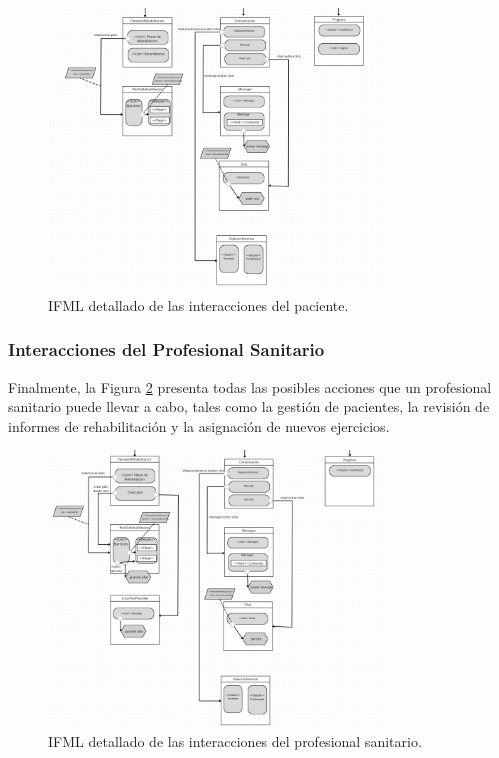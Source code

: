 \documentclass{article}
\begin{document}
\begin{figure}[H]
	\centering
	\includegraphics[width=0.8\textwidth]{images/ifml_paciente.png}
	\caption{IFML detallado de las interacciones del paciente.}
	\label{fig:ifml_paciente}
\end{figure}
\newpage
\subsubsection{Interacciones del Profesional Sanitario}

Finalmente, la Figura \ref{fig:ifml_profesional} presenta todas las posibles acciones que un profesional sanitario puede llevar a cabo, tales como la gestión de pacientes, la revisión de informes de rehabilitación y la asignación de nuevos ejercicios.

\begin{figure}[H]
	\centering
	\includegraphics[width=0.8\textwidth]{images/ifml_profesional.png}
	\caption{IFML detallado de las interacciones del profesional sanitario.}
	\label{fig:ifml_profesional}
\end{figure}
\end{document}
